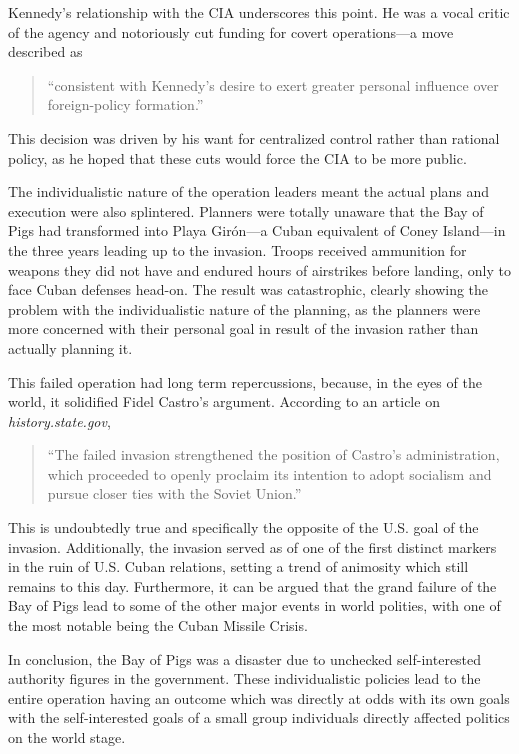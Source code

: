 \documentclass[12pt, twoside]{article}
\begin{document}
    Kennedy's relationship with the CIA underscores this point. He was a vocal critic of the agency and notoriously cut funding for covert operations—a move described as 
    
    \begin{quotation}
        ``consistent with Kennedy's desire to exert greater personal influence over foreign-policy formation.''~\parencite{JeffreysJones2003}
    \end{quotation}

    This decision was driven by his want for centralized control rather than rational policy, as he hoped that these cuts would force the CIA to be more public.

    The individualistic nature of the operation leaders meant the actual plans and execution were also splintered. Planners were totally unaware that the Bay of Pigs had transformed into Playa Girón—a Cuban equivalent of Coney Island—in the three years leading up to the invasion. \parencite{Wyden1979} Troops received ammunition for weapons they did not have and endured hours of airstrikes before landing, only to face Cuban defenses head-on. The result was catastrophic, clearly showing the problem with the individualistic nature of the planning, as the planners were more concerned with their personal goal in result of the invasion rather than actually planning it. 
    
    This failed operation had long term repercussions, because, in the eyes of the world, it solidified Fidel Castro's argument. According to an article on \textit{history.state.gov}, 

    \begin{quotation}
        ``The failed invasion strengthened the position of Castro's administration, which proceeded to openly proclaim its intention to adopt socialism and pursue closer ties with the Soviet Union.'' \parencite{state_bayofpigs}
    \end{quotation}

    This is undoubtedly true and specifically the opposite of the U.S. goal of the invasion. Additionally, the invasion served as of one of the first distinct markers in the ruin of U.S. Cuban relations, setting a trend of animosity which still remains to this day. Furthermore, it can be argued that the grand failure of the Bay of Pigs lead to some of the other major events in world polities, with one of the most notable being the Cuban Missile Crisis. \parencite{cfr_uscuba} 

    In conclusion, the Bay of Pigs was a disaster due to unchecked self-interested authority figures in the government. These individualistic policies lead to the entire operation having an outcome which was directly at odds with its own goals with the self-interested goals of a small group individuals directly affected politics on the world stage.
\end{document}
